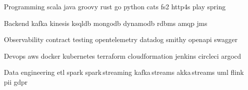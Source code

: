 
\begin{cvskills}

    \cvskill
    {Programming} %
    {scala {} java {} groovy {} rust {} go {} python {} cats {} fs2 {} http4s {} play {} spring}

    \cvskill
    {Backend} %
    {kafka {} kinesis {} ksqldb {} mongodb {} dynamodb {} rdbms {} amqp {} jms}

    \cvskill
    {Observability} %
    {contract testing {} opentelemetry {} datadog {} smithy {} openapi {} swagger}

    \cvskill
    {Devops} %
    {aws {} docker {} kubernetes {} terraform {} cloudformation {} jenkins {} circleci {} argocd}

    \cvskill
    {Data engineering} %
    {etl {} spark {} spark\,streaming {} kafka\,streams {} akka\,streams {} uml {} flink {} pii {} gdpr}

%

\end{cvskills}

